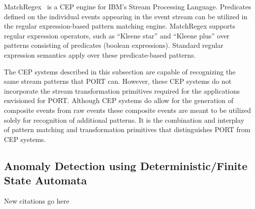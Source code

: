 MatchRegex~\cite{DBLP:conf/debs/Hirzel12} is a CEP engine for IBM’s Stream Processing
Language. Predicates defined on the individual events appearing in the event
stream can be utilized in the regular expression-based pattern matching
engine. MatchRegex supports regular expression operators, such as “Kleene star”
and “Kleene plus” over patterns consisting of predicates (boolean expressions).
Standard regular expression semantics apply over these predicate-based patterns.

The CEP systems described in this subsection are capable
of recognizing the same stream patterns that PORT can.
However, these CEP systems do not incorporate the
stream transformation primitives required for the applications
envisioned for PORT. Although CEP systems do allow for the
generation of composite events from raw events these composite events
are meant to be utilized solely for recognition of additional patterns.
It is the combination and interplay of pattern matching and transformation
primitives that distinguishes PORT from CEP systems.


\subsection{Anomaly Detection using Deterministic/Finite State Automata}
New citations go here

